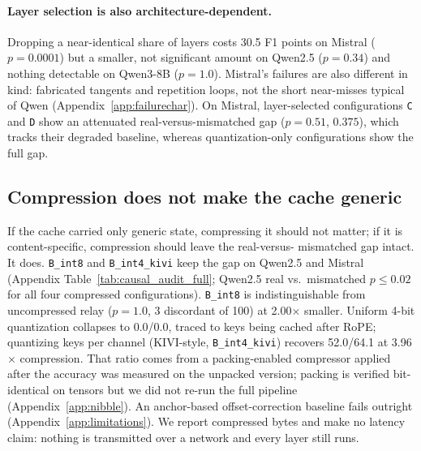\documentclass[11pt]{article}
\begin{document}
\paragraph{Layer selection is also architecture-dependent.} Dropping a
near-identical share of layers costs 30.5 F1 points on Mistral
($p=0.0001$) but a smaller, not significant amount on Qwen2.5 ($p=0.34$)
and nothing detectable on Qwen3-8B ($p=1.0$). Mistral's failures are also
different in kind: fabricated tangents and repetition loops, not the short
near-misses typical of Qwen (Appendix~\ref{app:failurechar}). On Mistral,
layer-selected configurations \texttt{C} and \texttt{D} show an attenuated
real-versus-mismatched gap ($p=0.51$, $0.375$), which tracks their
degraded baseline, whereas quantization-only configurations show the full
gap.

\subsection{Compression does not make the cache generic}

If the cache carried only generic state, compressing it should not matter;
if it is content-specific, compression should leave the real-versus-
mismatched gap intact. It does. \texttt{B\_int8} and \texttt{B\_int4\_kivi}
keep the gap on Qwen2.5 and Mistral (Appendix
Table~\ref{tab:causal_audit_full}; Qwen2.5 real vs.\ mismatched
$p\le0.02$ for all four compressed configurations). \texttt{B\_int8} is
indistinguishable from uncompressed relay ($p=1.0$, 3 discordant of 100)
at 2.00$\times$ smaller. Uniform 4-bit quantization collapses to 0.0/0.0,
traced to keys being cached after RoPE; quantizing keys per channel
(KIVI-style, \texttt{B\_int4\_kivi}) recovers 52.0/64.1 at 3.96$\times$
compression. That ratio comes from a packing-enabled compressor applied
after the accuracy was measured on the unpacked version; packing is
verified bit-identical on tensors but we did not re-run the full pipeline
(Appendix~\ref{app:nibble}). An anchor-based offset-correction baseline
fails outright (Appendix~\ref{app:limitations}). We report compressed
bytes and make no latency claim: nothing is transmitted over a network and
every layer still runs.
\end{document}
